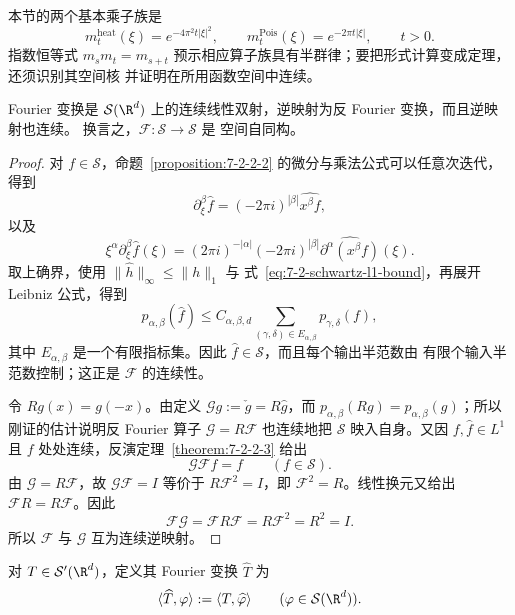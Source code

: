 本节的两个基本乘子族是
\[
 m_t^{\mathrm{heat}}(\xi)=e^{-4\pi^2t|\xi|^2},
 \qquad
 m_t^{\mathrm{Pois}}(\xi)=e^{-2\pi t|\xi|},
 \qquad t>0.
\]
指数恒等式 $m_s m_t=m_{s+t}$ 预示相应算子族具有半群律；要把形式计算变成定理，还须识别其空间核
并证明在所用函数空间中连续。

\begin{theorem}\label{theorem:7-2-3-1}
Fourier 变换是 $\mathcal S(\R^d)$ 上的连续线性双射，逆映射为反 Fourier 变换，而且逆映射也连续。
换言之，$\mathcal F:\mathcal S\to\mathcal S$ 是 \Frechet{} 空间自同构。
\end{theorem}

\begin{proof}
对 $f\in\mathcal S$，命题~\ref{proposition:7-2-2-2} 的微分与乘法公式可以任意次迭代，得到
\[
 \partial_\xi^\beta\widehat f
 =(-2\pi i)^{|\beta|}\widehat{x^\beta f},
\]
以及
\begin{equation}\label{eq:7-2-schwartz-seminorm-identity}
 \xi^\alpha\partial_\xi^\beta\widehat f(\xi)
 =(2\pi i)^{-|\alpha|}(-2\pi i)^{|\beta|}
   \widehat{\partial^\alpha(x^\beta f)}(\xi).
\end{equation}
取上确界，使用 $\|\widehat h\|_\infty\leq\|h\|_1$ 与
式~\eqref{eq:7-2-schwartz-l1-bound}，再展开 Leibniz 公式，得到
\begin{equation}\label{eq:7-2-schwartz-continuity}
 p_{\alpha,\beta}(\widehat f)
 \leq C_{\alpha,\beta,d}
 \sum_{(\gamma,\delta)\in E_{\alpha,\beta}}
 p_{\gamma,\delta}(f),
\end{equation}
其中 $E_{\alpha,\beta}$ 是一个有限指标集。因此 $\widehat f\in\mathcal S$，而且每个输出半范数由
有限个输入半范数控制；这正是 $\mathcal F$ 的连续性。

令 $Rg(x)=g(-x)$。由定义 $\mathcal Gg:=\check g=R\widehat g$，而
$p_{\alpha,\beta}(Rg)=p_{\alpha,\beta}(g)$；所以刚证的估计说明反 Fourier 算子
$\mathcal G=R\mathcal F$ 也连续地把 $\mathcal S$ 映入自身。又因
$f,\widehat f\in L^1$ 且 $f$ 处处连续，反演定理~\ref{theorem:7-2-2-3} 给出
\[
 \mathcal G\mathcal Ff=f\qquad(f\in\mathcal S).
\]
由 $\mathcal G=R\mathcal F$，故
$\mathcal G\mathcal F=I$ 等价于 $R\mathcal F^2=I$，即
$\mathcal F^2=R$。线性换元又给出 $\mathcal F R=R\mathcal F$。因此
\[
 \mathcal F\mathcal G
 =\mathcal F R\mathcal F=R\mathcal F^2=R^2=I.
\]
所以 $\mathcal F$ 与 $\mathcal G$ 互为连续逆映射。
\end{proof}

\begin{definition}\label{def:7-2-3-4}
对 $T\in\mathcal S'(\R^d)$，定义其 Fourier 变换 $\widehat T$ 为
\[
 \langle\widehat T,\varphi\rangle
 :=\langle T,\widehat\varphi\rangle
 \qquad(\varphi\in\mathcal S(\R^d)).
\]
\end{definition}

